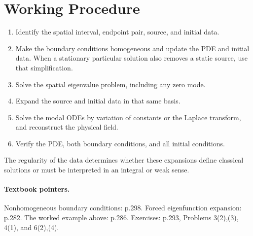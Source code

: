 \documentclass[11pt,a4paper]{article}
\begin{document}
\section*{Working Procedure}
\begin{enumerate}
 \item Identify the spatial interval, endpoint pair, source, and initial data.
 \item Make the boundary conditions homogeneous and update the PDE and initial
       data. When a stationary particular solution also removes a static source,
       use that simplification.
 \item Solve the spatial eigenvalue problem, including any zero mode.
 \item Expand the source and initial data in that same basis.
 \item Solve the modal ODEs by variation of constants or the Laplace transform,
       and reconstruct the physical field.
 \item Verify the PDE, both boundary conditions, and all initial conditions.
\end{enumerate}
The regularity of the data determines whether these expansions define classical
solutions or must be interpreted in an integral or weak sense.

\paragraph{Textbook pointers.}
Nonhomogeneous boundary conditions: p.298. Forced eigenfunction expansion: p.282.
The worked example above: p.286. Exercises: p.293,
Problems 3(2),(3), 4(1), and 6(2),(4).
\end{document}

